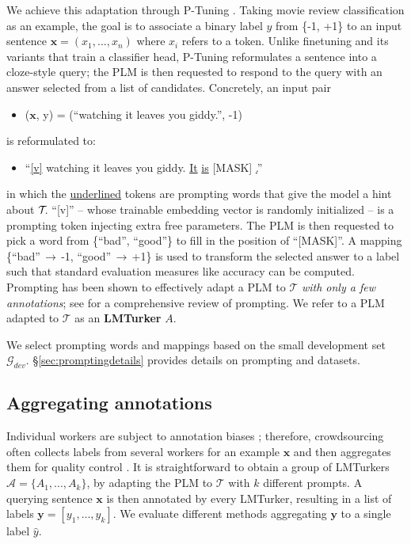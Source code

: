 \documentclass[11pt]{article}
\def\tasksymbol{$\mathcal{T\mkern-5mu}$\xspace}
\def\mdr{LMTurker\xspace}
\def\mdrs{LMTurkers\xspace}
\def\secref#1{\S\ref{sec:#1}}
\def\seclabel#1{\label{sec:#1}}
\begin{document}
We achieve this adaptation
through P-Tuning \citep{Ptuningpaper}.
Taking movie review classification
as an example,
the goal is to associate
a binary label $y$ from \{-1, +1\}
to an input sentence
$\mathbf{x} = (x_1, ..., x_n)$ where
$x_i$ refers to a token.
Unlike finetuning and
its variants \citep{devlin-etal-2019-bert,adapterpaper,maskingpaper}
that train a classifier head,
P-Tuning reformulates a sentence into a
cloze-style query;
the PLM is then requested to
respond to the query
with an answer selected from
a list of candidates.
Concretely, an input pair

\begin{itemize}
\item[] \small{($\mathbf{x}$, y) = (``watching it leaves you giddy.'', -1)}
\end{itemize}

\noindent is reformulated to:

\begin{itemize}
\item[] \small{``\underline{[v]} watching it leaves you giddy. \underline{It} \underline{is} [MASK] \underline{.}''}
\end{itemize}

\noindent in which the \underline{underlined} tokens are
prompting words that give the model
a hint about \tasksymbol.
``[v]'' -- whose trainable embedding vector is
randomly initialized -- is a
prompting token injecting extra free parameters.
The PLM is then requested to pick a word
from \{``bad'', ``good''\} to
fill in the position of ``[MASK]''.
A mapping
\{``bad''$\,\to\,$-1, ``good''$\,\to\,$+1\}
is used to
transform the selected answer
to a label such that standard evaluation
measures like accuracy can be computed.
Prompting has been shown to effectively
adapt a PLM to $\mathcal{T}$
\emph{with only a few annotations};
see \citep{liu2021pre} for a
comprehensive review of prompting.
We refer to a PLM adapted to $\mathcal{T}$ as
an \textbf{\mdr} $A$.


We select
prompting words and mappings based on the
small development set $\mathcal{G}_{dev}$.
\secref{promptingdetails} provides
details on prompting and datasets.

\subsection{Aggregating annotations}
\seclabel{subsec:aggregateannotations}
Individual workers are subject to annotation biases
\citep{snow-etal-2008-cheap};
therefore, crowdsourcing often collects labels from
several workers \citep{crowdsourcingsurvey}
for an
example $\mathbf{x}$ and then
aggregates them
for quality control
\citep{crowdsourcingagg}.
It is straightforward to obtain
a group of \mdrs
$\mathcal{A}=\{A_1, ..., A_k\}$,
by adapting the PLM to $\mathcal{T}$
with $k$ different prompts.
A querying sentence $\mathbf{x}$
is then annotated by every \mdr,
resulting in a list of labels
$\mathbf{y} = [y_1, ..., y_k]$.
We evaluate different methods
aggregating $\mathbf{y}$ to a single
label $\hat{y}$.
\end{document}
